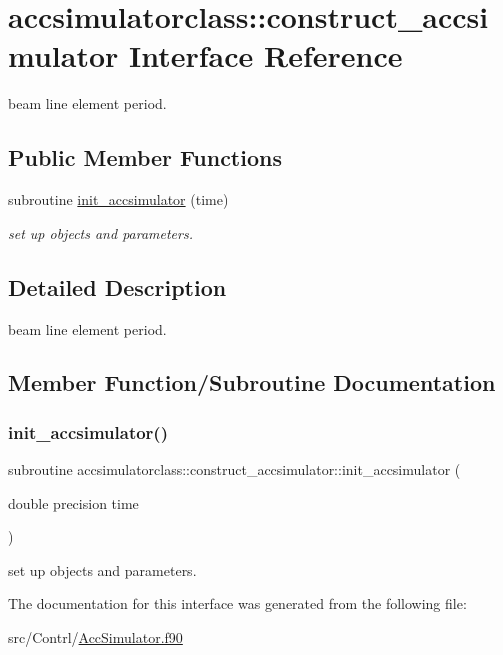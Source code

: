 \hypertarget{interfaceaccsimulatorclass_1_1construct__accsimulator}{}\section{accsimulatorclass\+::construct\+\_\+accsimulator Interface Reference}
\label{interfaceaccsimulatorclass_1_1construct__accsimulator}


beam line element period.  


\subsection*{Public Member Functions}
\begin{DoxyCompactItemize}
\item 
subroutine \mbox{\hyperlink{interfaceaccsimulatorclass_1_1construct__accsimulator_aecb5022974541714834ea7032a44fb1b}{init\+\_\+accsimulator}} (time)
\begin{DoxyCompactList}\small\item\em set up objects and parameters. \end{DoxyCompactList}\end{DoxyCompactItemize}


\subsection{Detailed Description}
beam line element period. 

\subsection{Member Function/\+Subroutine Documentation}
\mbox{\label{interfaceaccsimulatorclass_1_1construct__accsimulator_aecb5022974541714834ea7032a44fb1b}} 
\subsubsection{\texorpdfstring{init\_accsimulator()}{init\_accsimulator()}}
{\footnotesize\ttfamily subroutine accsimulatorclass\+::construct\+\_\+accsimulator\+::init\+\_\+accsimulator (\begin{DoxyParamCaption}\item[{double precision}]{time }\end{DoxyParamCaption})}



set up objects and parameters. 



The documentation for this interface was generated from the following file\+:\begin{DoxyCompactItemize}
\item 
src/\+Contrl/\mbox{\hyperlink{_acc_simulator_8f90}{Acc\+Simulator.\+f90}}\end{DoxyCompactItemize}
